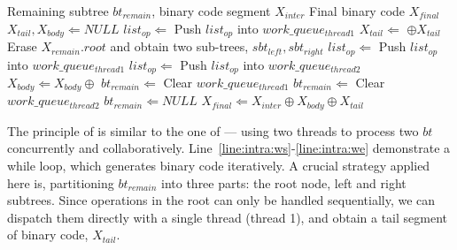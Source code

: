 \begin{algorithm}[!ht]
    \caption{}
    \begin{algorithmic}[1]
        \Require    Remaining subtree $bt_{remain}$, binary code segment $X_{inter}$
        \Ensure     Final binary code $X_{final}$
        \State $X_{tail}, X_{body} \Leftarrow NULL$
            \label{line:intra:ws}
        \State $list_{op} \Leftarrow$ 
        \State Push $list_{op}$ into $work\_queue_{thread1}$
        \State $X_{tail} \Leftarrow$  $\oplus X_{tail}$
        \State Erase $X_{remain}.root$ and obtain two sub-trees, $sbt_{left}, sbt_{right}$
        \Statex
        \State $list_{op} \Leftarrow$ 
        \State Push $list_{op}$ into $work\_queue_{thread1}$
        \State $list_{op} \Leftarrow$ 
        \State Push $list_{op}$ into $work\_queue_{thread2}$
        \State $X_{body} \Leftarrow X_{body} \oplus$ 
        \Statex
        \State $bt_{remain} \Leftarrow$ 
        \State Clear $work\_queue_{thread1}$
        \State $bt_{remain} \Leftarrow$ 
        \State Clear $work\_queue_{thread2}$
        \Else
        \State $bt_{remain} \Leftarrow NULL$
        \EndIf
        \EndWhile   \label{line:intra:we}
        \State $X_{final} \Leftarrow X_{inter} \oplus X_{body} \oplus X_{tail}$
        \State {}
    \end{algorithmic}
    \label{alg:intra}
\end{algorithm}
The principle of  is similar to the one of  ---
using two threads to process two $bt$ concurrently and collaboratively.
Line~\ref{line:intra:ws}-\ref{line:intra:we} demonstrate a while loop, 
which generates binary code iteratively.
A crucial strategy applied here is, partitioning $bt_{remain}$ into three parts:
the root node, left and right subtrees.
Since operations in the root can only be handled sequentially, 
we can dispatch them directly with a single thread (thread 1), 
and obtain a tail segment of binary code, $X_{tail}$.
